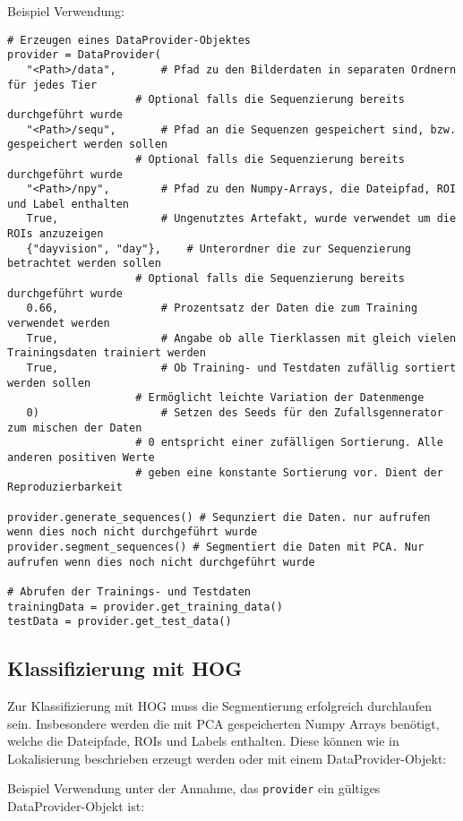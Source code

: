 Beispiel Verwendung:
\begin{verbatim}
# Erzeugen eines DataProvider-Objektes
provider = DataProvider(
   "<Path>/data", 		# Pfad zu den Bilderdaten in separaten Ordnern für jedes Tier
					# Optional falls die Sequenzierung bereits durchgeführt wurde
   "<Path>/sequ", 		# Pfad an die Sequenzen gespeichert sind, bzw. gespeichert werden sollen
					# Optional falls die Sequenzierung bereits durchgeführt wurde
   "<Path>/npy",   		# Pfad zu den Numpy-Arrays, die Dateipfad, ROI und Label enthalten
   True,				# Ungenutztes Artefakt, wurde verwendet um die ROIs anzuzeigen
   {"dayvision", "day"},  	# Unterordner die zur Sequenzierung betrachtet werden sollen
   					# Optional falls die Sequenzierung bereits durchgeführt wurde
   0.66,  				# Prozentsatz der Daten die zum Training verwendet werden
   True,  				# Angabe ob alle Tierklassen mit gleich vielen Trainingsdaten trainiert werden
   True,  				# Ob Training- und Testdaten zufällig sortiert werden sollen
   					# Ermöglicht leichte Variation der Datenmenge
   0) 					# Setzen des Seeds für den Zufallsgennerator zum mischen der Daten
   					# 0 entspricht einer zufälligen Sortierung. Alle anderen positiven Werte
   					# geben eine konstante Sortierung vor. Dient der Reproduzierbarkeit

provider.generate_sequences() # Sequnziert die Daten. nur aufrufen wenn dies noch nicht durchgeführt wurde
provider.segment_sequences() # Segmentiert die Daten mit PCA. Nur aufrufen wenn dies noch nicht durchgeführt wurde

# Abrufen der Trainings- und Testdaten
trainingData = provider.get_training_data()
testData = provider.get_test_data()
\end{verbatim}
 

\subsection*{Klassifizierung mit HOG}
Zur Klassifizierung mit HOG muss die Segmentierung erfolgreich durchlaufen sein. Insbesondere werden die mit PCA gespeicherten Numpy Arrays benötigt, welche die Dateipfade, ROIs und Labels enthalten. Diese können wie in Lokalisierung beschrieben erzeugt werden oder mit einem DataProvider-Objekt:

Beispiel Verwendung unter der Annahme, das \texttt{provider} ein gültiges DataProvider-Objekt ist:

